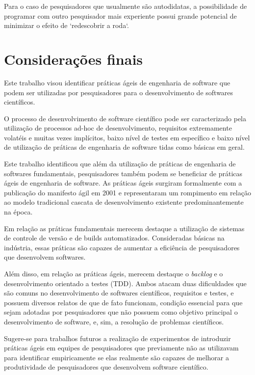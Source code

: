\documentclass[
	article,			%
	11pt,				%
	oneside,			%
	a4paper,			%
	english,			%
	brazil,				%
	sumario=tradicional
	]{abntex2}
\begin{document}
Para o caso de pesquisadores que usualmente são autodidatas, a possibilidade de programar com outro pesquisador mais experiente possui grande potencial de minimizar o efeito de `redescobrir a roda`.

% 

\section*{Considerações finais}
Este trabalho visou identificar práticas ágeis de engenharia de software que podem ser utilizadas por pesquisadores para o desenvolvimento de softwares científicos.

O processo de desenvolvimento de software científico pode ser caracterizado pela utilização de processos ad-hoc de desenvolvimento, requisitos extremamente volatéis e muitas vezes implícitos, baixo nível de testes em específico e baixo nível de utilização de práticas de engenharia de software tidas como básicas em geral.

Este trabalho identificou que além da utilização de práticas de engenharia de softwares fundamentais, pesquisadores também podem se beneficiar de práticas ágeis de engenharia de software. As práticas ágeis surgiram formalmente com a publicação do manifesto ágil em 2001 e representaram um rompimento em relação ao modelo tradicional cascata de desenvolvimento existente predominantemente na época.

Em relação as práticas fundamentais merecem destaque a utilização de sistemas de controle de versão e de builds automatizados. Consideradas básicas na indústria, essas práticas são capazes de aumentar a eficiência de pesquisadores que desenvolvem softwares.

Além disso, em relação as práticas ágeis, merecem destaque o \emph{backlog} e o desenvolvimento orientado a testes (TDD). Ambos atacam duas dificuldades que são comuns no desenvolvimento de softwares científicos, requisitos e testes, e possuem diversos relatos de que de fato funcionam, condição essencial para que sejam adotadas por pesquisadores que não possuem como objetivo principal o desenvolvimento de software, e, sim, a resolução de problemas científicos.

Sugere-se para trabalhos futuros a realização de experimentos de introduzir práticas ágeis em equipes de pesquisadores que previamente não as utilizavam para identificar empiricamente se elas realmente são capazes de melhorar a produtividade de pesquisadores que desenvolvem software científico.
\end{document}

